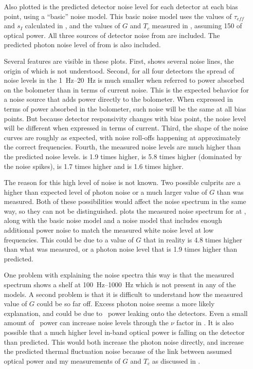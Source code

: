 Also plotted is the predicted detector noise level for each detector at each bias point, using a ``basic'' noise model.
This basic noise model uses the values of $\tau_{eff}$ and $s_I$ calculated in , and the values of $G$ and $T_c$ measured in , assuming \SI{150}{\pW} of optical power.
All three sources of detector noise from  are included.
The predicted photon noise level of  from  is also included.

Several features are visible in these plots.
First,  shows several noise lines, the origin of which is not understood.
Second, for all four detectors the spread of noise levels in the \SIrange{1}{20}{\hertz} is much smaller when referred to power absorbed on the bolometer than in terms of current noise.
This is the expected behavior for a noise source that adds power directly to the bolometer.
When expressed in terms of power absorbed in the bolometer, such noise will be the same at all bias points.
But because detector responsivity changes with bias point, the noise level will be different when expressed in terms of current.
Third, the shape of the noise curves are roughly as expected, with noise roll-offs happening at approximately the correct frequencies.
Fourth, the measured noise levels are much higher than the predicted noise levels.
 is 1.9 times higher,  is 5.8 times higher (dominated by the noise spikes),  is 1.7 times higher and  is 1.6 times higher.

The reason for this high level of noise is not known.
Two possible culprits are a higher than expected level of photon noise or a much larger value of $G$ than was measured.
Both of these possibilities would affect the noise spectrum in the same way, so they can not be distinguished.
 plots the measured noise spectrum for  at \SOC, along with the basic noise model and a noise model that includes enough additional power noise to match the measured white noise level at low frequencies.
This could be due to a value of $G$ that in reality is 4.8 times higher than what was measured, or a photon noise level that is 1.9 times higher than predicted.

One problem with explaining the noise spectra this way is that the measured spectrum shows a shelf at \SIrange{100}{1000}{\hertz} which is not present in any of the models.
A second problem is that it is difficult to understand how the measured value of $G$ could be so far off.
Excess photon noise seems a more likely explanation, and could be due to \IR\ power leaking onto the detectors.
Even a small amount of \IR\ power can increase noise levels through the $\nu$ factor in .
It is also possible that a much higher level in-band optical power is falling on the detector than predicted.
This would both increase the photon noise directly, and increase the predicted thermal fluctuation noise because of the link between assumed optical power and my measurements of $G$ and $T_c$ as discussed in .

